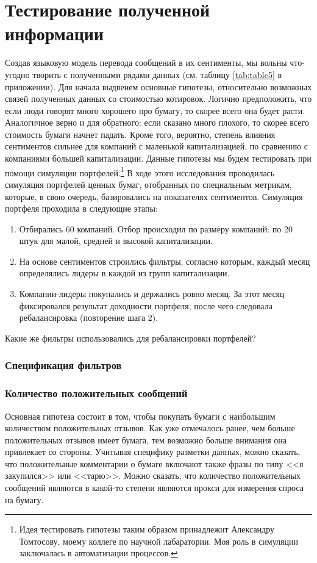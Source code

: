 \documentclass{article}
\begin{document}
\section{Тестирование полученной информации}
\label{sec:portfolio}
Создав языковую модель перевода сообщений в их сентименты, мы вольны что-угодно творить с полученными рядами данных (см. таблицу \ref{tab:table5} в приложении). Для начала выдвенем основные гипотезы, относительно возможных связей полученных данных со стоимостью котировок. Логично предположить, что если люди говорят много хорошего про бумагу, то скорее всего она будет расти. Аналогичное верно и для обратного: если сказано много плохого, то скорее всего стоимость бумаги начнет падать. Кроме того, вероятно, степень влияния сентиментов сильнее для компаний с маленькой капитализацией, по сравнению с компаниями большей капитализации. Данные гипотезы мы будем тестировать при помощи симуляции портфелей.\footnote{Идея тестировать гипотезы таким образом принадлежит Александру Томтосову, моему коллеге по научной лабаратории. Моя роль в симуляции заключалась в автоматизации процессов.}
В ходе этого исследования проводилась симуляция портфелей ценных бумаг, отобранных по специальным метрикам, которые, в свою очередь, базировались на показателях сентиментов. Симуляция портфеля проходила в следующие этапы:

\begin{enumerate}
	\item Отбирались 60 компаний. Отбор происходил по размеру компаний: по 20 штук для малой, средней и высокой капитализации.
	\item На основе сентиментов строились фильтры, согласно которым, каждый месяц определялись лидеры в каждой из групп капитализации.
	\item Компании-лидеры покупались и держались ровно месяц. За этот месяц фиксировался результат доходности портфеля, после чего следовала ребалансировка (повторение шага 2).
\end{enumerate}

Какие же фильтры использовались для ребалансировки портфелей?
\subsubsection*{Спецификация фильтров}
\subsubsection{Количество положительных сообщений} Основная гипотеза состоит в том, чтобы покупать бумаги с наибольшим количеством положительных отзывов. Как уже отмечалось ранее, чем больше положительных отзывов имеет бумага, тем возможно больше внимания она привлекает со стороны. Учитывая специфику разметки данных, можно сказать, что положительные комментарии о бумаге включают также фразы по типу <<я закупился>> или <<тарю>>. Можно сказать, что количество положительных сообщений являются в какой-то степени являются прокси для измерения спроса на бумагу. 
\end{document}

